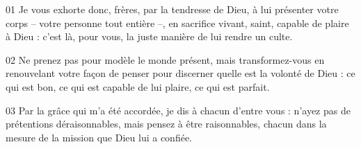 01 Je vous exhorte donc, frères, par la tendresse de Dieu, à lui présenter votre corps – votre personne tout entière –, en sacrifice vivant, saint, capable de plaire à Dieu : c’est là, pour vous, la juste manière de lui rendre un culte.

02 Ne prenez pas pour modèle le monde présent, mais transformez-vous en renouvelant votre façon de penser pour discerner quelle est la volonté de Dieu : ce qui est bon, ce qui est capable de lui plaire, ce qui est parfait.

03 Par la grâce qui m’a été accordée, je dis à chacun d’entre vous : n’ayez pas de prétentions déraisonnables, mais pensez à être raisonnables, chacun dans la mesure de la mission que Dieu lui a confiée.

